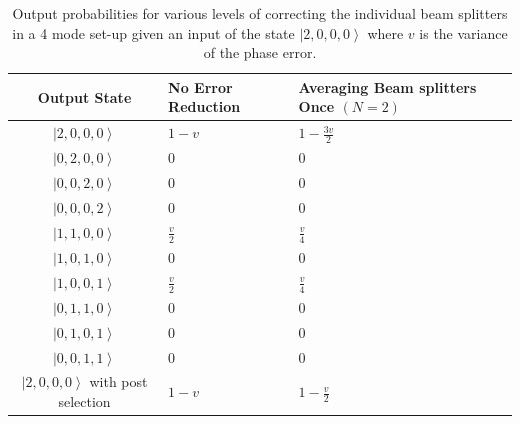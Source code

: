 \documentclass[aps,pra,twocolumn,superscriptaddress,numerical]{revtex4-1}
\begin{document}
\begin{widetext}
\begin{table}
{		\begin{centering}
			\begin{tabular}{|c|>{\centering}p{4cm}|>{\centering}p{4cm}|}
				\hline 
				Output State & No Error Reduction & Averaging Beam splitters Once $\left(N=2\right)$\tabularnewline
				\hline 
				\hline 
				$\left|2,0,0,0\right\rangle $ & $1-v$ & $1-\frac{3v}{2}$\tabularnewline
				\hline 
				$\left|0,2,0,0\right\rangle $ & $0$ & $0$\tabularnewline
				\hline 
				$\left|0,0,2,0\right\rangle $ & $0$ & $0$\tabularnewline
				\hline 
				$\left|0,0,0,2\right\rangle $ & $0$ & $0$\tabularnewline
				\hline 
				$\left|1,1,0,0\right\rangle $ & $\frac{v}{2}$ & $\frac{v}{4}$\tabularnewline
				\hline 
				$\left|1,0,1,0\right\rangle $ & $0$ & $0$\tabularnewline
				\hline 
				$\left|1,0,0,1\right\rangle $ & $\frac{v}{2}$ & $\frac{v}{4}$\tabularnewline
				\hline 
				$\left|0,1,1,0\right\rangle $ & $0$ & $0$\tabularnewline
				\hline 
				$\left|0,1,0,1\right\rangle $ & $0$ & $0$\tabularnewline
				\hline 
				$\left|0,0,1,1\right\rangle $ & $0$ & $0$\tabularnewline
				\hline 
				$\left|2,0,0,0\right\rangle $ with post selection & $1-v$ & $1-\frac{v}{2}$\tabularnewline
				\hline 
			\end{tabular}
			\par\end{centering}
		
	}
	
	\caption[Output probabilities for various levels of correcting the individual
	beam splitters in a 4 mode set-up given an input of the state $\left|2,0,0,0\right\rangle $.]{Output probabilities for various levels of correcting the individual
		beam splitters in a 4 mode set-up given an input of the state $\left|2,0,0,0\right\rangle $
		where $v$ is the variance of the phase error. \label{tab:2 photon output prob bs}}
\end{table}
\begin{table}
	\resizebox{\textwidth}{!}{
		
}
\end{table}
\end{widetext}
\end{document}
